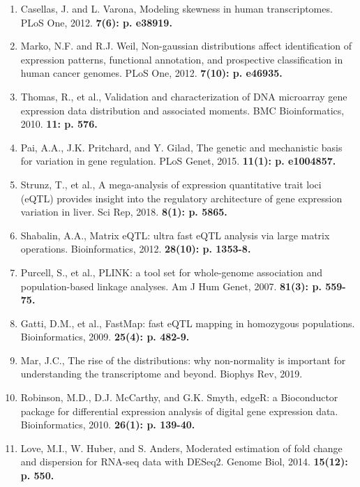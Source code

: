 \documentclass[11pt]{article}
\begin{document}
\begin{enumerate}
\item Casellas, J. and L. Varona, Modeling skewness in human transcriptomes. PLoS One, 2012. \bf{7}(6): p. e38919.

\item Marko, N.F. and R.J. Weil, Non-gaussian distributions affect identification of expression patterns, functional annotation, and prospective classification in human cancer genomes. PLoS One, 2012. \bf{7}(10): p. e46935.

\item Thomas, R., et al., Validation and characterization of DNA microarray gene expression data distribution and associated moments. BMC Bioinformatics, 2010. \bf{11}: p. 576.

\item Pai, A.A., J.K. Pritchard, and Y. Gilad, The genetic and mechanistic basis for variation in gene regulation. PLoS Genet, 2015. \bf{11}(1): p. e1004857.

\item Strunz, T., et al., A mega-analysis of expression quantitative trait loci (eQTL) provides insight into the regulatory architecture of gene expression variation in liver. Sci Rep, 2018. \bf{8}(1): p. 5865.

\item Shabalin, A.A., Matrix eQTL: ultra fast eQTL analysis via large matrix operations. Bioinformatics, 2012. \bf{28}(10): p. 1353-8.

\item Purcell, S., et al., PLINK: a tool set for whole-genome association and population-based linkage analyses. Am J Hum Genet, 2007. \bf{81}(3): p. 559-75.

\item Gatti, D.M., et al., FastMap: fast eQTL mapping in homozygous populations. Bioinformatics, 2009. \bf{25}(4): p. 482-9.

\item Mar, J.C., The rise of the distributions: why non-normality is important for understanding the transcriptome and beyond. Biophys Rev, 2019.

\item Robinson, M.D., D.J. McCarthy, and G.K. Smyth, edgeR: a Bioconductor package for differential expression analysis of digital gene expression data. Bioinformatics, 2010. \bf{26}(1): p. 139-40.

\item Love, M.I., W. Huber, and S. Anders, Moderated estimation of fold change and dispersion for RNA-seq data with DESeq2. Genome Biol, 2014. \bf{15}(12): p. 550.


\end{enumerate}
\end{document}
